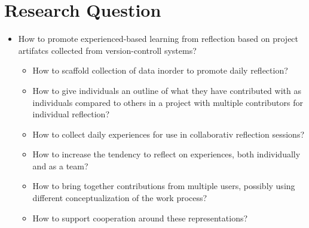 \section{Research Question}

\begin{itemize}
	\item How to promote experienced-based learning from reflection based on project artifatcs collected from version-controll systems?
	\begin{itemize}
		\item How to scaffold collection of data inorder to promote daily reflection?
		\item How to give individuals an outline of what they have contributed with as individuals compared to others in a project with multiple contributors for individual reflection?
		\item How to collect daily experiences for use in collaborativ reflection sessions?
		\item How to increase the tendency to reflect on experiences, both individually and as a team? 
		\item How to bring together contributions from multiple users, possibly using different conceptualization of the work process? 
		\item How to support cooperation around these representations?
	\end{itemize}
\end{itemize}